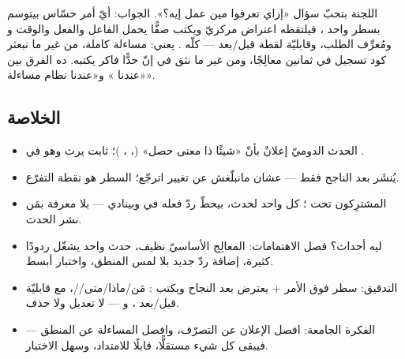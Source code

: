 \begin{spotlight}
اللجنة بتحبّ سؤال «إزاي تعرفوا مين عمل إيه؟». الجواب: أيّ أمر حسّاس بيتوسم بسطر
واحد \code{[Auditable]}، فيلتقطه اعتراض مركزيّ ويكتب صفًّا يحمل الفاعل والفعل
والوقت و ومُعرِّف الطلب، وقابليّة لقطة قبل/بعد — كلّه . يعني:
مساءلة كاملة، من غير ما نبعثر كود تسجيل في ثمانين معالِجًا، ومن غير ما نثق في إنّ
حدًّا فاكر يكتبه. ده الفرق بين «عندنا » و«عندنا نظام مساءلة».
\end{spotlight}

\subsection{الخلاصة}

\begin{summary}
\begin{itemize}
\item الحدث الدوميّ إعلانٌ بأنّ «شيئًا ذا معنى حصل» (،
  ، )؛  ثابت يرث
   وهو  في .
\item يُنشَر بعد  الناجح فقط — عشان مانبلّغش عن تغيير
  اترجّع؛ السطر  هو نقطة التفرّع.
\item المشترِكون تحت ؛ كل واحد
   لحدث، بيحطّ ردّ فعله في  وبينادي
   — بلا معرفة بمَن نشر الحدث.
\item ليه أحداث؟ فصل الاهتمامات: المعالِج الأساسيّ نظيف، حدث واحد يشغّل ردودًا
  كثيرة، إضافة ردّ جديد بلا لمس المنطق، واختبار أبسط.
\item التدقيق: سطر \code{[Auditable]} فوق الأمر +  يعترض
  بعد النجاح ويكتب : مَن/ماذا/متى//، مع
  قابليّة قبل/بعد ، و — لا تعديل ولا حذف.
\item الفكرة الجامعة: افصل الإعلان عن التصرّف، وافصل المساءلة عن
  المنطق — فيبقى كل شيء مستقلًّا، قابلًا للامتداد، وسهل الاختبار.
\end{itemize}
\end{summary}
